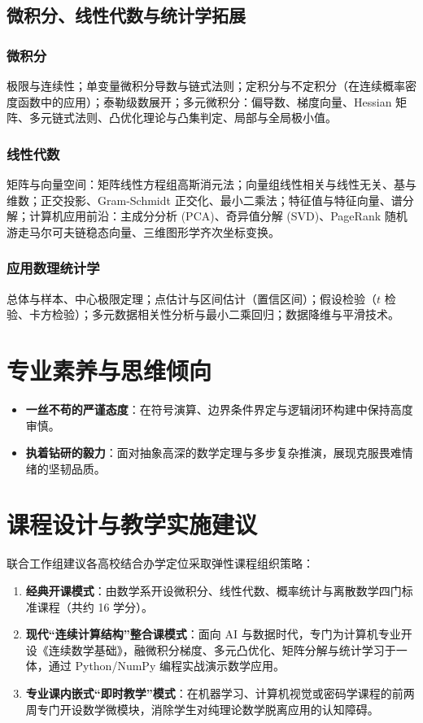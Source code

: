 \subsection{微积分、线性代数与统计学拓展}

\subsubsection{微积分}
极限与连续性；单变量微积分导数与链式法则；定积分与不定积分（在连续概率密度函数中的应用）；泰勒级数展开；多元微积分：偏导数、梯度向量、Hessian 矩阵、多元链式法则、凸优化理论与凸集判定、局部与全局极小值。

\subsubsection{线性代数}
矩阵与向量空间：矩阵线性方程组高斯消元法；向量组线性相关与线性无关、基与维数；正交投影、Gram-Schmidt 正交化、最小二乘法；特征值与特征向量、谱分解；计算机应用前沿：主成分分析 (PCA)、奇异值分解 (SVD)、PageRank 随机游走马尔可夫链稳态向量、三维图形学齐次坐标变换。

\subsubsection{应用数理统计学}
总体与样本、中心极限定理；点估计与区间估计（置信区间）；假设检验（$t$ 检验、卡方检验）；多元数据相关性分析与最小二乘回归；数据降维与平滑技术。

\section{专业素养与思维倾向}

\begin{itemize}
    \item \textbf{一丝不苟的严谨态度}：在符号演算、边界条件界定与逻辑闭环构建中保持高度审慎。
    \item \textbf{执着钻研的毅力}：面对抽象高深的数学定理与多步复杂推演，展现克服畏难情绪的坚韧品质。
\end{itemize}

\section{课程设计与教学实施建议}

联合工作组建议各高校结合办学定位采取弹性课程组织策略：
\begin{enumerate}
    \item \textbf{经典开课模式}：由数学系开设微积分、线性代数、概率统计与离散数学四门标准课程（共约 16 学分）。
    \item \textbf{现代“连续计算结构”整合课模式}：面向 AI 与数据时代，专门为计算机专业开设《连续数学基础》，融微积分梯度、多元凸优化、矩阵分解与统计学习于一体，通过 Python/NumPy 编程实战演示数学应用。
    \item \textbf{专业课内嵌式“即时教学”模式}：在机器学习、计算机视觉或密码学课程的前两周专门开设数学微模块，消除学生对纯理论数学脱离应用的认知障碍。
\end{enumerate}

